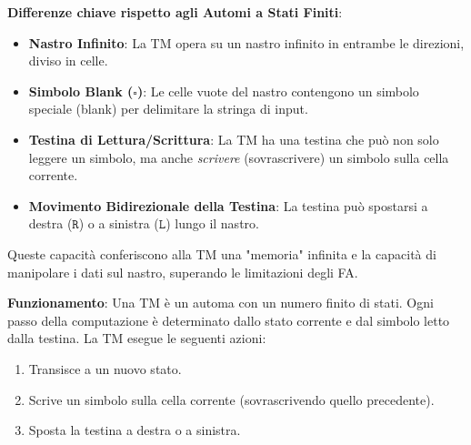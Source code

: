 \documentclass[a4paper]{article}
\theoremstyle{definition} %
\newcommand{\blankS}{\ensuremath{\square}}
\begin{document}
\textbf{Differenze chiave rispetto agli Automi a Stati Finiti}:
\begin{itemize}
    \item \textbf{Nastro Infinito}: La TM opera su un nastro infinito in entrambe le direzioni, diviso in celle.
    \item \textbf{Simbolo Blank ($\blankS$)}: Le celle vuote del nastro contengono un simbolo speciale (blank) per delimitare la stringa di input.
    \item \textbf{Testina di Lettura/Scrittura}: La TM ha una testina che può non solo leggere un simbolo, ma anche \emph{scrivere} (sovrascrivere) un simbolo sulla cella corrente.
    \item \textbf{Movimento Bidirezionale della Testina}: La testina può spostarsi a destra ($\texttt{R}$) o a sinistra ($\texttt{L}$) lungo il nastro.
\end{itemize}
Queste capacità conferiscono alla TM una "memoria" infinita e la capacità di manipolare i dati sul nastro, superando le limitazioni degli FA.

\textbf{Funzionamento}:
Una TM è un automa con un numero finito di stati. Ogni passo della computazione è determinato dallo stato corrente e dal simbolo letto dalla testina. La TM esegue le seguenti azioni:
\begin{enumerate}
    \item Transisce a un nuovo stato.
    \item Scrive un simbolo sulla cella corrente (sovrascrivendo quello precedente).
    \item Sposta la testina a destra o a sinistra.
\end{enumerate}
\end{document}

